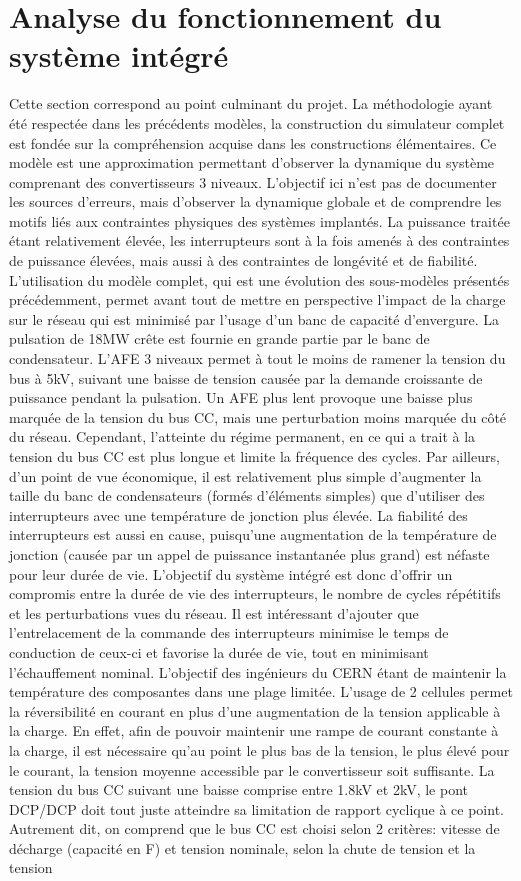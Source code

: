\section{Analyse du fonctionnement du système intégré}
Cette section correspond au point culminant du projet. La méthodologie ayant été respectée dans les précédents modèles, la construction du simulateur complet est fondée sur la compréhension acquise dans les constructions élémentaires. Ce modèle est une approximation permettant d'observer la dynamique du système comprenant des convertisseurs 3 niveaux. L'objectif ici n'est pas de documenter les sources d'erreurs, mais d'observer la dynamique globale et de comprendre les motifs liés aux contraintes physiques des systèmes implantés. La puissance traitée étant relativement élevée, les interrupteurs sont à la fois amenés à des contraintes de puissance élevées, mais aussi à des contraintes de longévité et de fiabilité. L'utilisation du modèle complet, qui est une évolution des sous-modèles présentés précédemment, permet avant tout de mettre en perspective l'impact de la charge sur le réseau qui est minimisé par l'usage d'un banc de capacité d'envergure. La pulsation de 18MW crête est fournie en grande partie par le banc de condensateur. L'AFE 3 niveaux permet à tout le moins de ramener la tension du bus à 5kV, suivant une baisse de tension causée par la demande croissante de puissance pendant la pulsation. Un AFE plus lent provoque une baisse plus marquée de la tension du bus CC, mais une perturbation moins marquée du côté du réseau. Cependant, l'atteinte du régime permanent, en ce qui a trait à la tension du bus CC est plus longue et limite la fréquence des cycles. Par ailleurs, d'un point de vue économique, il est relativement plus simple d'augmenter la taille du banc de condensateurs (formés d'éléments simples) que d'utiliser des interrupteurs avec une température de jonction plus élevée. La fiabilité des interrupteurs est aussi en cause, puisqu'une augmentation de la température de jonction (causée par un appel de puissance instantanée plus grand) est néfaste pour leur durée de vie. L'objectif du système intégré est donc d'offrir un compromis entre la durée de vie des interrupteurs, le nombre de cycles répétitifs et les perturbations vues du réseau. Il est intéressant d'ajouter que l'entrelacement de la commande des interrupteurs minimise le temps de conduction de ceux-ci et favorise la durée de vie, tout en minimisant l'échauffement nominal. L'objectif des ingénieurs du CERN étant de maintenir la température des composantes dans une plage limitée. L'usage de 2 cellules permet  la réversibilité en courant en plus d'une augmentation de la tension applicable à la charge. En effet, afin de pouvoir  maintenir une rampe de courant constante à la charge, il est nécessaire qu'au point le plus bas de la tension, le plus élevé pour le courant, la tension moyenne accessible par le convertisseur soit suffisante. La tension du bus CC suivant une baisse comprise entre 1.8kV et 2kV, le pont DCP/DCP doit tout juste atteindre sa limitation de rapport cyclique à ce point. Autrement dit, on comprend que le bus CC est choisi selon 2 critères: vitesse de décharge (capacité en F) et tension nominale, selon la chute de tension et la tension 